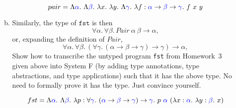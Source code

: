 \documentclass{article}
\theoremstyle{definition}
\newcommand{\meta}[1]{{\color{blue}#1}}
\begin{document}
\begin{enumerate}[start=1,label={{\bf Problem \arabic*}.},ref=\arabic*,left=0pt..0pt,widest*=10,align=left,itemindent=*]
\begin{enumerate}[(a),left=1em]
    $$pair = \Lambda \meta{\alpha}.\ \Lambda \meta{\beta}.\ \lambda x.\ \lambda y.\ \Lambda \meta{\gamma}.\ \lambda f : \meta{\alpha} \to \meta{\beta} \to \meta{\gamma}.\ f \ x\ y$$
  
  \item
    Similarly, the type of $\mathtt{fst}$ is then
    \[
      \forall\alpha.\,\forall\beta.\, Pair\ \alpha\ \beta \to \alpha,
    \]
    or, expanding the definition of $Pair$,
    \[
      \forall\alpha.\,\forall\beta.\, (\forall\gamma.\, (\alpha\to\beta\to\gamma)\to\gamma) \to \alpha,
    \]
    Show how to transcribe the untyped program \texttt{fst} from Homework~3
    given above into System F (by adding type annotations, type abstractions,
    and type applications) such that it has the above type. No need to formally
    prove it has the type. Just convince yourself.

    $$fst = \Lambda \meta{\alpha}.\ \Lambda \meta{\beta}.\ \lambda p : \forall \meta{\gamma}.\ (\meta{\alpha}\to\meta{\beta}\to\meta{\gamma}) \to \meta{\gamma}.\ p\ \meta{\alpha}\ (\lambda x : \meta{\alpha}.\ \lambda y : \meta{\beta}.\ x)$$


\end{enumerate}
\end{enumerate}
\end{document}

